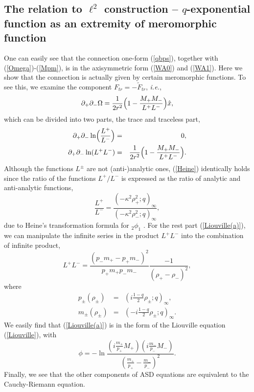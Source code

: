 \documentclass[a4paper,10pt]{article}
\newcommand{\ie}{\textit{i.e.}}
\begin{document}
\subsection{The relation to $\ell^2$ construction -- $q$-exponential function as an extremity of meromorphic function}
One can easily see that the connection one-form (\ref{qbps}), together with (\ref{Omega})-(\ref{Mpm}), is in the axisymmetric form (\ref{WA0}) and (\ref{WA1}).
Here we show that the connection is actually given by certain meromorphic functions.
To see this, we examine the component $F_{tr}=-\tilde F_{tr}$, \ie,
\begin{equation}
\partial_+\partial_- \Omega=\frac{1}{2r^2}\Bigl(1-\frac{M_+M_-}{L^+L^-}\Bigr)\hat{x},
\end{equation}
which can be divided into two parts, the trace and traceless part,
\begin{eqnarray}
\partial_+\partial_- \ln \Bigl(\frac{L^+}{L^-}\Bigr)&=&0,\label{Heine} \\ 
\partial_+\partial_- \ln (L^+L^-)&=&\frac{1}{2r^2}\Bigl(1-\frac{M_+M_-}{L^+L^-}\Bigr).
\label{Liouville(a)}
\end{eqnarray}
Although the functions $L^\pm$ are not (anti-)analytic ones, (\ref{Heine}) identically holds since the ratio of the functions $L^+/L^-$ is expressed as the ratio of analytic and anti-analytic functions,
\begin{equation}
\frac{L^+}{L^-}=\frac{(-\kappa^2\rho_+^2;q)_{\infty}}{(-\kappa^2\rho_-^2;q)_{\infty}},
\end{equation}
due to  Heine's transformation formula for $_2\phi_1$ \cite{GR}.
For the rest part (\ref{Liouville(a)}), we can manipulate the infinite series in the product $L^+L^-$ into the combination of infinite product,
\begin{equation}
L^+L^-=\frac{(p_-m_+-p_+m_-)^2}{p_+m_+p_-m_-}\frac{-1}{(\rho_+-\rho_-)^2},
\end{equation}
where 
\begin{eqnarray}
p_\pm(\rho_\pm)&=&\left(i\frac{1-q}{2}\rho_\pm;q\right)_\infty,\\
m_\pm(\rho_\pm)&=&\left(-i\frac{1-q}{2}\rho_\pm;q\right)_\infty.
\end{eqnarray}
We easily find that (\ref{Liouville(a)}) is in the form of the Liouville equation (\ref{Liouville}), with 
\begin{equation}
\phi=-\ln\frac{\left(i\frac{m_+}{p_+}M_+\right)\left(i\frac{m_-}{p_-}M_-\right)}{\left(\frac{m_+}{p_+}-\frac{m_-}{p_-}\right)^2}.
\end{equation}
Finally, we see that the other components of ASD equations are equivalent to the Cauchy-Riemann equation.
\end{document}
